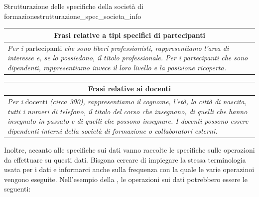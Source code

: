 \documentclass[12pt]{report}
\newcommand{\namerefl}[1]{%
	\bgroup
	\let\nmu\MakeLowercase
	\nameref{#1}\egroup}
\newcommand{\nmu}{}
\begin{document}
\begin{example}{\nmu Strutturazione delle specifiche della società di formazione}{strutturazione_spec_societa_info}
 		\vspace{0.3cm}

 		\noindent
 		\begin{tabular}{|p{14cm}|}
 			\hline
 			\multicolumn{1}{|c|}{\textbf{Frasi relative a tipi specifici di partecipanti}} \\
 			\hline
 			\textit{Per i} partecipanti \textit{che sono liberi professionisti, rappresentiamo l'area di interesse e, se lo possiedono, il titolo professionale. Per i partecipanti che sono dipendenti, rappresentiamo invece il loro livello e la posizione ricoperta.} \\
 			\hline
 		\end{tabular}

 		\vspace{0.3cm}

 		\noindent
 		\begin{tabular}{|p{14cm}|}
 			\hline
 			\multicolumn{1}{|c|}{\textbf{Frasi relative ai docenti}} \\
 			\hline
 			\textit{Per i} docenti \textit{(circa 300), rappresentiamo il cognome, l'età, la città di nascita, tutti i numeri di telefono, il titolo del corso che insegnano, di quelli che hanno insegnato in passato e di quelli che possono insegnare. I docenti possono essere dipendenti interni della società di formazione o collaboratori esterni.} \\
 			\hline
 		\end{tabular}
 	\end{example}
 	Inoltre, accanto alle specifiche sui dati vanno raccolte le specifiche sulle operazioni da effettuare su questi dati. Bisgona cercare di impiegare la stessa terminologia usata per i dati e informarci anche sulla frequenza con la quale le varie operazinoi vengono eseguite. Nell'esempio della \namerefl{exa:societa_formazione}, le operazioni sui dati potrebbero essere le seguenti:
\end{document}
